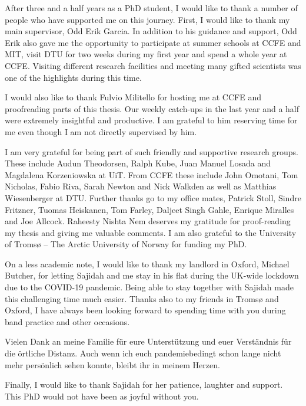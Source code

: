 After three and a half years as a PhD student, I would like to thank a number of people
who have supported me on this journey. First, I would like to thank my main supervisor,
Odd Erik Garcia. In addition to his guidance and support, Odd Erik also gave me the
opportunity to participate at summer schools at CCFE and MIT, visit DTU for two weeks
during my first year and spend a whole year at CCFE. Visiting different research
facilities and meeting many gifted scientists was one of the highlights during this
time.

I would also like to thank Fulvio Militello for hosting me at CCFE and proofreading
parts of this thesis. Our weekly catch-ups in the last year and a half were extremely
insightful and productive. I am grateful to him reserving time for me even though I am
not directly supervised by him.

I am very grateful for being part of such friendly and supportive research groups. These
include Audun Theodorsen, Ralph Kube, Juan Manuel Losada and Magdalena Korzeniowska at
UiT. From CCFE these include John Omotani, Tom Nicholas, Fabio Riva, Sarah Newton and
Nick Walkden as well as Matthias Wiesenberger at DTU. Further thanks go to my office
mates, Patrick Stoll, Sindre Fritzner, Tuomas Heiskanen, Tom Farley, Daljeet Singh
Gahle, Enrique Miralles and Joe Allcock. Raheesty Nishta Nem deserves my gratitude for
proof-reading my thesis and giving me valuable comments. I am also grateful to the
University of Tromsø – The Arctic University of Norway for funding my PhD.

On a less academic note, I would like to thank my landlord in Oxford, Michael Butcher,
for letting Sajidah and me stay in his flat during the UK-wide lockdown due to the
COVID-19 pandemic. Being able to stay together with Sajidah made this challenging time
much easier. Thanks also to my friends in Tromsø and Oxford, I have always been looking
forward to spending time with you during band practice and other occasions.

Vielen Dank an meine Familie für eure Unterstützung und euer Verständnis für die
örtliche Distanz. Auch wenn ich euch pandemiebedingt schon lange nicht mehr persönlich
sehen konnte, bleibt ihr in meinem Herzen.

Finally, I would like to thank Sajidah for her patience, laughter and support. This PhD
would not have been as joyful without you.
